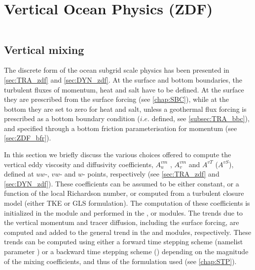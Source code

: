 \documentclass[../tex_main/NEMO_manual]{subfiles}
\begin{document}
\chapter{Vertical Ocean Physics (ZDF)}
\label{chap:ZDF}
\minitoc



\newpage
$\ $\newline    %


\section{Vertical mixing}
\label{sec:ZDF_zdf}

The discrete form of the ocean subgrid scale physics has been presented in 
\autoref{sec:TRA_zdf} and \autoref{sec:DYN_zdf}. At the surface and bottom boundaries, 
the turbulent fluxes of momentum, heat and salt have to be defined. At the 
surface they are prescribed from the surface forcing (see \autoref{chap:SBC}), 
while at the bottom they are set to zero for heat and salt, unless a geothermal 
flux forcing is prescribed as a bottom boundary condition ($i.e.$  
defined, see \autoref{subsec:TRA_bbc}), and specified through a bottom friction 
parameterisation for momentum (see \autoref{sec:ZDF_bfr}).

In this section we briefly discuss the various choices offered to compute 
the vertical eddy viscosity and diffusivity coefficients, $A_u^{vm}$ , 
$A_v^{vm}$ and $A^{vT}$ ($A^{vS}$), defined at $uw$-, $vw$- and $w$- 
points, respectively (see \autoref{sec:TRA_zdf} and \autoref{sec:DYN_zdf}). These 
coefficients can be assumed to be either constant, or a function of the local 
Richardson number, or computed from a turbulent closure model (either 
TKE or GLS formulation). The computation of these coefficients is initialized 
in the  module and performed in the ,  or 
 modules. The trends due to the vertical momentum and tracer 
diffusion, including the surface forcing, are computed and added to the 
general trend in the  and  modules, respectively. 
These trends can be computed using either a forward time stepping scheme 
(namelist parameter ) or a backward time stepping 
scheme () depending on the magnitude of the mixing 
coefficients, and thus of the formulation used (see \autoref{chap:STP}).
\end{document}
